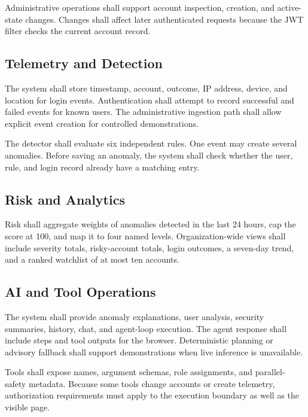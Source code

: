 Administrative operations shall support account inspection, creation, and active-state changes. Changes shall affect later authenticated requests because the JWT filter checks the current account record.

\subsection{Telemetry and Detection}
The system shall store timestamp, account, outcome, IP address, device, and location for login events. Authentication shall attempt to record successful and failed events for known users. The administrative ingestion path shall allow explicit event creation for controlled demonstrations.

The detector shall evaluate six independent rules. One event may create several anomalies. Before saving an anomaly, the system shall check whether the user, rule, and login record already have a matching entry.

\subsection{Risk and Analytics}
Risk shall aggregate weights of anomalies detected in the last 24 hours, cap the score at 100, and map it to four named levels. Organization-wide views shall include severity totals, risky-account totals, login outcomes, a seven-day trend, and a ranked watchlist of at most ten accounts.

\subsection{AI and Tool Operations}
The system shall provide anomaly explanations, user analysis, security summaries, history, chat, and agent-loop execution. The agent response shall include steps and tool outputs for the browser. Deterministic planning or advisory fallback shall support demonstrations when live inference is unavailable.

Tools shall expose names, argument schemas, role assignments, and parallel-safety metadata. Because some tools change accounts or create telemetry, authorization requirements must apply to the execution boundary as well as the visible page.

